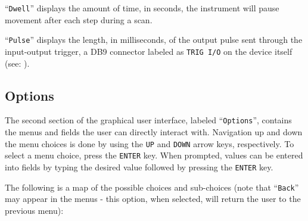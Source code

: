 \documentclass{article}
\begin{document}
``\verb|Dwell|'' displays the amount of time, in seconds, the instrument will pause movement after each step during a scan.

``\verb|Pulse|'' displays the length, in milliseconds, of the output pulse sent through the input-output trigger, a DB9 connector labeled as \verb|TRIG I/O| on the device itself (see: ).

\subsection{Options} \label{subsection:options}

The second section of the graphical user interface, labeled ``\verb|Options|'', contains the menus and fields the user can directly interact with. Navigation up and down the menu choices is done by using the \verb|UP| and \verb|DOWN| arrow keys, respectively. To select a menu choice, press the \verb|ENTER| key. When prompted, values can be entered into fields by typing the desired value followed by pressing the \verb|ENTER| key.

The following is a map of the possible choices and sub-choices (note that ``\verb|Back|'' may appear in the menus - this option, when selected, will return the user to the previous menu):
\end{document}
